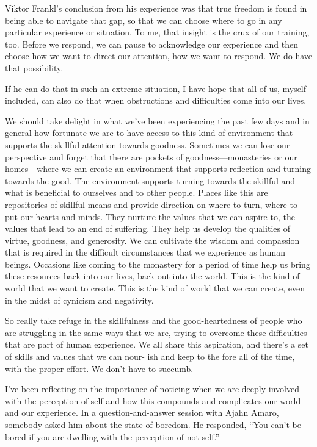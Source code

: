 Viktor Frankl's conclusion from his experience was that true freedom is found in being able to navigate that gap, so that we can choose where to go in any particular experience or situation. To me, that insight is the crux of our training, too. Before we respond, we can pause to acknowledge our experience and then choose how we want to direct our attention, how we want to respond. We do have that possibility.

If he can do that in such an extreme situation, I have hope that all of us, myself included, can also do that when obstructions and difficulties come into our lives.

We should take delight in what we've been experiencing the past few days and in general how fortunate we are to have access to this kind of environment that supports the skillful attention towards goodness. Sometimes we can lose our perspective and forget that there are pockets of goodness---monasteries or our homes---where we can create an environment that supports reflection and turning towards the good. The environment supports turning towards the skillful and what is beneficial to ourselves and to other people. Places like this are repositories of skillful means and provide direction on where to turn, where to put our hearts and minds. They nurture the values that we can aspire to, the values that lead to an end of suffering. They help us develop the qualities of virtue, goodness, and generosity. We can cultivate the wisdom and compassion that is required in the difficult circumstances that we experience as human beings. Occasions like coming to the monastery for a period of time help us bring these resources back into our lives, back out into the world. This is the kind of world that we want to create. This is the kind of world that we can create, even in the midst of cynicism and negativity.

So really take refuge in the skillfulness and the good-heartedness of people who are struggling in the same ways that we are, trying to overcome these difficulties that \linebreak are part of human experience. We all share this aspiration, \linebreak and there's a set of skills and values that we can nour- \linebreak ish and keep to the fore all of the time, with the proper effort. We don't have to succumb.

I've been reflecting on the importance of noticing when we are deeply involved with the perception of self and how this compounds and complicates our world and our experience. In a question-and-answer session with Ajahn Amaro, somebody asked him about the state of boredom. He responded, ``You can't be bored if you are dwelling with the perception of not-self.''

